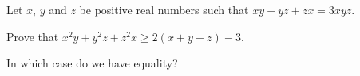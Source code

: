 \documentclass[varwidth]{standalone}
\begin{document}
    Let $x$, $y$ and $z$ be positive real numbers such that $xy + yz + zx = 3xyz$.

    Prove that $x^2y + y^2z + z^2x \geq 2(x + y + z) - 3$.

    In which case do we have equality?
\end{document}
